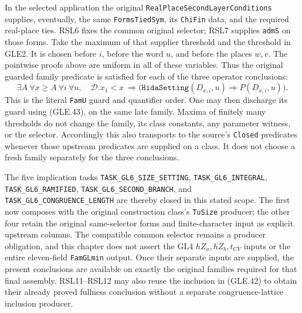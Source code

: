 In the selected application the original
\texttt{RealPlaceSecondLayerConditions} supplies, eventually, the
same \texttt{FormsTiedSym}, its \texttt{ChiFin} data, and the
required real-place ties.  RSL6 fixes the common original selector;
RSL7 supplies \texttt{admS} on those forms.  Take the maximum of
that supplier threshold and the threshold in GLE2.  It is chosen
before $i$, before the word $u$, and before the places $w,v$.
The pointwise proofs above are uniform in all of these variables.
Thus the original guarded family predicate is satisfied for each
of the three operator conclusions:
\[
 \exists A\ \forall x\ge A\ \forall i\ \forall u,
 \quad \mathcal D.x_1<x\ \Longrightarrow
 \bigl(\texttt{HidaSetting}(D_{x,i},u)\Longrightarrow
          P(D_{x,i},u)\bigr).                                  \tag{GLE.44}
\]
This is the literal \texttt{FamU} guard and quantifier order.
One may then discharge its guard using (GLE.43), on the same late
family.  Maxima of finitely many thresholds do not change the
family, its class constants, any parameter witness, or the
selector.  Accordingly this also transports to the source's
\texttt{Closed} predicates whenever those upstream predicates are
supplied on a class.  It does not choose a fresh family separately
for the three conclusions.

The five implication tasks
\texttt{TASK\_GL6\_SIZE\_SETTING},
\texttt{TASK\_GL6\_INTEGRAL},
\texttt{TASK\_GL6\_RAMIFIED},
\texttt{TASK\_GL6\_SECOND\_BRANCH}, and
\texttt{TASK\_GL6\_CONGRUENCE\_LENGTH} are thereby closed in this
stated scope.  The first now composes with the original construction
class's \texttt{TuSize} producer; the other four retain the
original same-selector forms and finite-character input as explicit
upstream columns.  The compatible common selector remains a
producer obligation, and this chapter does not assert the GL4
$hZ_a,hZ_b,t_{CV}$ inputs or the entire eleven-field
\texttt{FamGLmin} output.  Once their separate inputs are supplied,
the present conclusions are available on exactly the original
families required for that final assembly.  RSL11--RSL12 may also
reuse the inclusion in (GLE.42) to obtain their already proved
fullness conclusion without a separate congruence-lattice inclusion
producer.


